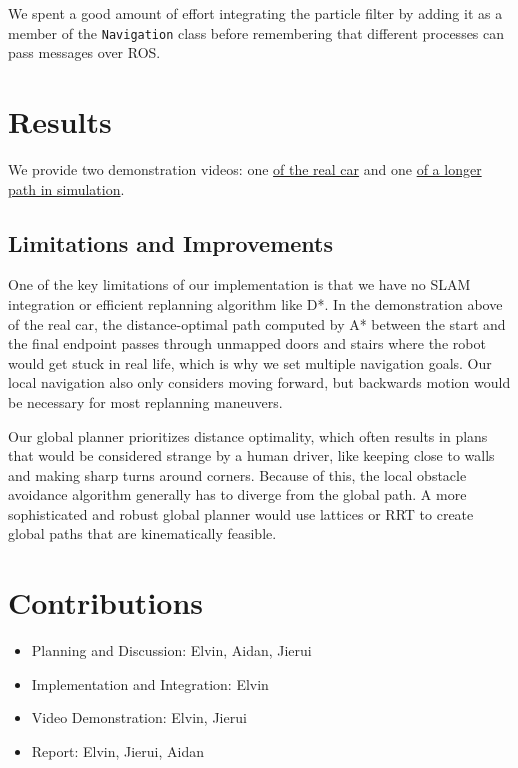 \documentclass[11pt]{article}
\newcommand{\code}[1]{{\small \tt #1}}
\begin{document}
\bigskip
\noindent
We spent a good amount of effort integrating the particle filter by adding it as
a member of the \code{Navigation} class before remembering that different
processes can pass messages over ROS.

\section{Results}

We provide two demonstration videos: one
\href{https://drive.google.com/file/d/1prjtLJ-S2PJ_5IOR8hiYJ8r8EqiVAX28/view?usp=sharing}{of the real car}
and one
\href{https://drive.google.com/file/d/1jECZf_MdrUwXP73rCSbKSITewcob6CJw/view?usp=sharing}{of a longer path in simulation}.

\subsection{Limitations and Improvements}

One of the key limitations of our implementation is that we have no SLAM
integration or efficient replanning algorithm like D*. In the demonstration
above of the real car, the distance-optimal path computed by A* between the
start and the final endpoint passes through unmapped doors and stairs where the
robot would get stuck in real life, which is why we set multiple navigation
goals. Our local navigation also only considers moving forward, but backwards
motion would be necessary for most replanning maneuvers.

\bigskip
\noindent
Our global planner prioritizes distance optimality, which often results in plans
that would be considered strange by a human driver, like keeping close to walls
and making sharp turns around corners. Because of this, the local obstacle
avoidance algorithm generally has to diverge from the global path. A more
sophisticated and robust global planner would use lattices or RRT to create
global paths that are kinematically feasible.

\section{Contributions}

\begin{itemize}
    \setlength\itemsep{0pt}
    \item Planning and Discussion: Elvin, Aidan, Jierui
    \item Implementation and Integration: Elvin
    \item Video Demonstration: Elvin, Jierui
    \item Report: Elvin, Jierui, Aidan
\end{itemize}
\end{document}
